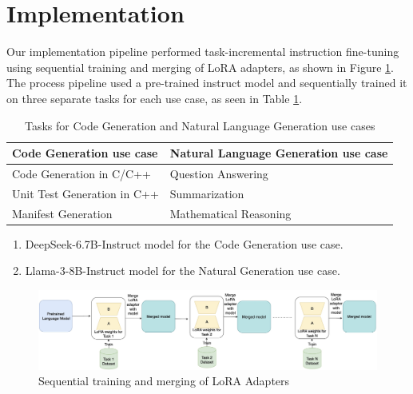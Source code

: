 


\section{Implementation} \label{Implementation}

Our implementation pipeline performed task-incremental instruction fine-tuning using sequential training and merging of LoRA adapters, as shown in Figure \ref{fig:SequentialTraining}. The process pipeline used a pre-trained instruct model and sequentially trained it on three separate tasks for each use case, as seen in Table \ref{tab:UseCaseTasks}. 
\begin{table}[h!]
\centering
\caption{Tasks for Code Generation and Natural Language Generation use cases}
\label{tab:UseCaseTasks}
\begin{tabular}{| m{6cm} | m{6cm} |}
\hline
\textbf{Code Generation use case} & \textbf{Natural Language Generation use case} \\
\hline
Code Generation in C/C++ & Question Answering \\
Unit Test Generation in C++ & Summarization \\
Manifest Generation & Mathematical Reasoning \\
\hline
\end{tabular}
\end{table}
\begin{enumerate}
\item DeepSeek-6.7B-Instruct model for the Code Generation use case.
\item Llama-3-8B-Instruct model for the Natural Generation use case.
\end{enumerate}

\begin{figure}[h]
    \centering
    \includegraphics[width=1\textwidth]{Figures/methodology/lora_finetuning.jpeg} 
    \caption{Sequential training and merging of LoRA Adapters}
    \label{fig:SequentialTraining}
\end{figure}

